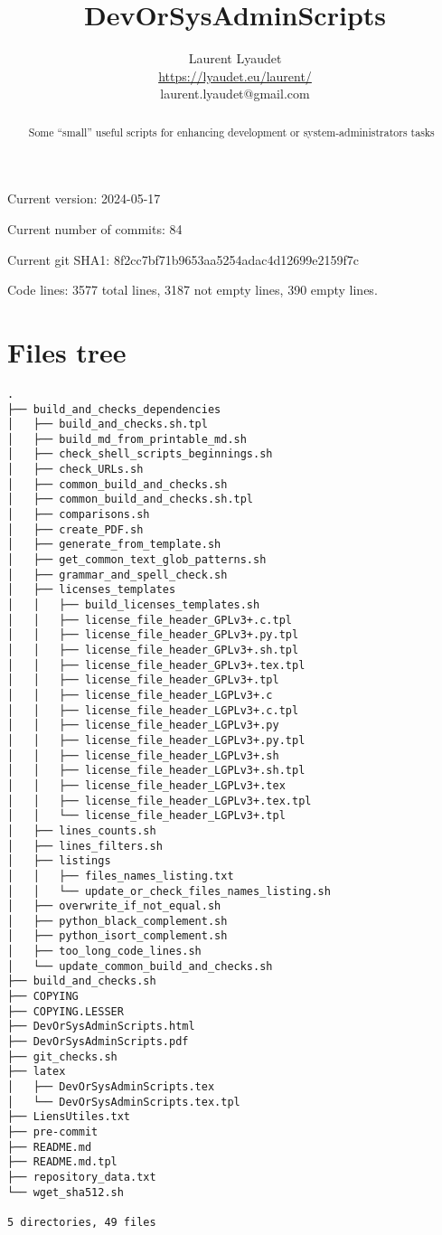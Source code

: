 \documentclass{article}
\begin{document}
\author{
  Laurent Lyaudet\\
  \url{https://lyaudet.eu/laurent/}\\
  laurent.lyaudet@gmail.com
}
\title{DevOrSysAdminScripts}

\maketitle
\begin{abstract}
Some ``small'' useful scripts
for enhancing development or system-administrators tasks
\end{abstract}

Current version: 2024-05-17

Current number of commits: 84

Current git SHA1: 8f2cc7bf71b9653aa5254adac4d12699e2159f7c

Code lines: 3577 total lines, 3187 not empty lines, 390 empty lines.

\section{Files tree}
\label{section:tree}

\begin{verbatim}
.
├── build_and_checks_dependencies
│   ├── build_and_checks.sh.tpl
│   ├── build_md_from_printable_md.sh
│   ├── check_shell_scripts_beginnings.sh
│   ├── check_URLs.sh
│   ├── common_build_and_checks.sh
│   ├── common_build_and_checks.sh.tpl
│   ├── comparisons.sh
│   ├── create_PDF.sh
│   ├── generate_from_template.sh
│   ├── get_common_text_glob_patterns.sh
│   ├── grammar_and_spell_check.sh
│   ├── licenses_templates
│   │   ├── build_licenses_templates.sh
│   │   ├── license_file_header_GPLv3+.c.tpl
│   │   ├── license_file_header_GPLv3+.py.tpl
│   │   ├── license_file_header_GPLv3+.sh.tpl
│   │   ├── license_file_header_GPLv3+.tex.tpl
│   │   ├── license_file_header_GPLv3+.tpl
│   │   ├── license_file_header_LGPLv3+.c
│   │   ├── license_file_header_LGPLv3+.c.tpl
│   │   ├── license_file_header_LGPLv3+.py
│   │   ├── license_file_header_LGPLv3+.py.tpl
│   │   ├── license_file_header_LGPLv3+.sh
│   │   ├── license_file_header_LGPLv3+.sh.tpl
│   │   ├── license_file_header_LGPLv3+.tex
│   │   ├── license_file_header_LGPLv3+.tex.tpl
│   │   └── license_file_header_LGPLv3+.tpl
│   ├── lines_counts.sh
│   ├── lines_filters.sh
│   ├── listings
│   │   ├── files_names_listing.txt
│   │   └── update_or_check_files_names_listing.sh
│   ├── overwrite_if_not_equal.sh
│   ├── python_black_complement.sh
│   ├── python_isort_complement.sh
│   ├── too_long_code_lines.sh
│   └── update_common_build_and_checks.sh
├── build_and_checks.sh
├── COPYING
├── COPYING.LESSER
├── DevOrSysAdminScripts.html
├── DevOrSysAdminScripts.pdf
├── git_checks.sh
├── latex
│   ├── DevOrSysAdminScripts.tex
│   └── DevOrSysAdminScripts.tex.tpl
├── LiensUtiles.txt
├── pre-commit
├── README.md
├── README.md.tpl
├── repository_data.txt
└── wget_sha512.sh

5 directories, 49 files
\end{verbatim}
\end{document}
